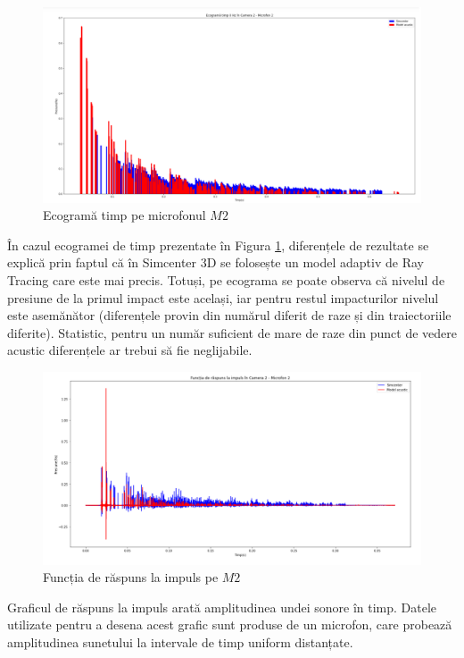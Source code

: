 	\begin{figure}[!htb]
		\centering
		\includegraphics[width=1\linewidth]{imagini/eco_3.png}
		\caption{Ecogramă timp pe microfonul $M2$}
		\label{Fig29}
	\end{figure}

	În cazul ecogramei de timp prezentate în Figura \ref{Fig29}, diferențele de rezultate se explică prin faptul că în Simcenter 3D se folosește un model adaptiv de Ray Tracing care este mai precis. Totuși, pe ecograma se poate observa că nivelul de presiune de la primul impact este același, iar pentru restul impacturilor nivelul este asemănător (diferențele provin din numărul diferit de raze și din traiectoriile diferite). Statistic, pentru un număr suficient de mare de raze din punct de vedere acustic diferențele ar trebui să fie neglijabile.
	
	\begin{figure}[!htb]
		\centering
		\includegraphics[width=1\linewidth]{imagini/ir_3.png}
		\caption{Funcția de răspuns la impuls pe $M2$}
		\label{Fig26}
	\end{figure}

	Graficul de răspuns la impuls arată amplitudinea undei sonore în timp. Datele utilizate pentru a desena acest grafic sunt produse de un microfon, care probează amplitudinea sunetului la intervale de timp uniform distanțate.

